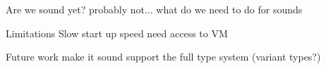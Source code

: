 \begin{outline}

\1 Are we sound yet?
    \2 probably not...
    \2 what do we need to do for sounds

\1 Limitations
    \2 Slow start up speed
    \2 need access to VM

\1 Future work
    \2 make it sound
    \2 support the full type system (variant types?)

\end{outline}